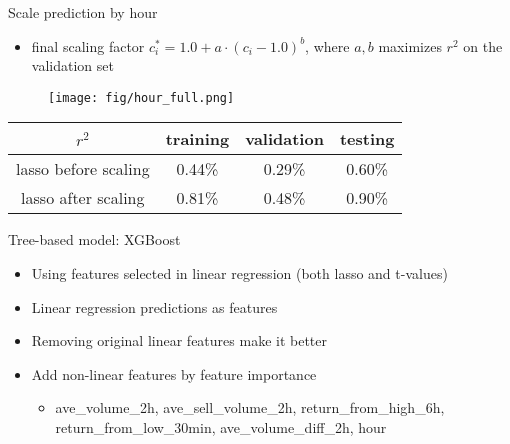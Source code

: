 \documentclass[9pt]{beamer}
\begin{document}
\begin{frame}{Scale prediction by hour}

\begin{itemize}
    \item final scaling factor $c^{*}_i = 1.0+a\cdot (c_i-1.0)^{b}$, where $a,b$ maximizes $r^2$ on the validation set
\end{itemize}

\begin{figure}
    \centering
    \texttt{[image: fig/hour\_full.png]}
\end{figure}

\begin{table}[h!]
\centering
\begin{tabular}{c|c|c|c}
\hline
$r^2$ & \textbf{training} & \textbf{validation} & \textbf{testing} \\ \hline
lasso before scaling      & 0.44\%      & 0.29\%      & 0.60\%      \\ \hline
lasso after scaling      & 0.81\%      & 0.48\%      & 0.90\%      \\ \hline
\end{tabular}
\end{table}



\end{frame}




\begin{frame}{Tree-based model: XGBoost}


\begin{itemize}
    \item Using features selected in linear regression (both lasso and t-values)
    \item Linear regression predictions as features
    \item Removing original linear features make it better
    \item Add non-linear features by feature importance
    \begin{itemize}
        \item ave\_volume\_2h, ave\_sell\_volume\_2h, return\_from\_high\_6h, return\_from\_low\_30min, ave\_volume\_diff\_2h, hour
    \end{itemize}
\end{itemize}



\end{frame}
\end{document}
